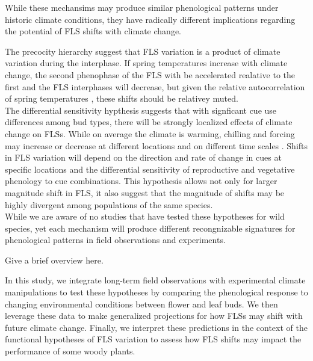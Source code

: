 \documentclass[11pt]{article}
\begin{document}
\noindent While these mechansims may produce similar phenological patterns under historic climate conditions, they have radically different implications regarding the potential of FLS shifts with climate change. 

The precocity hierarchy suggest that FLS variation is a product of climate variation during the interphase. If spring temperatures increase with climate change, the second phenophase of the FLS with be accelerated realative to the first and the FLS interphases will decrease, but given the relative autocorrelation of spring temperatures \citep{}, these shifts should be relativey muted. \\

\noindent The differential sensitivity hypthesis suggests that with signficant cue use differences among bud types, there will be strongly localized effects of climate change on FLSs. While on average the climate is warming, chilling and forcing may increase or decrease at different locations and on different time scales \citep{Ettinger}. Shifts in FLS variation will depend on the direction and rate of change in cues at specific locations and the differential sensitivity of reproductive and vegetative phenology to cue combinations. This hypothesis allows not only for larger magnitude shift in FLS, it also suggest that the magnitude of shifts may be highly divergent among populations of the same species.\\

\noindent While we are aware of no studies that have tested these hypotheses for wild species, yet each mechanism will produce different recongnizable signatures for phenological patterns in field observations and experiments. 

Give a brief overview here.

\noindent In this study, we integrate long-term field observations with experimental climate manipulations to test these hypotheses by comparing the phenological response to changing environmental conditions between flower and leaf buds. We then leverage these data to make generalized projections for how FLSs may shift with future climate change. Finally, we interpret these predictions in the context of the functional hypotheses of FLS variation to assess how FLS shifts may impact the performance of some woody plants.\\  

 
\end{document}
